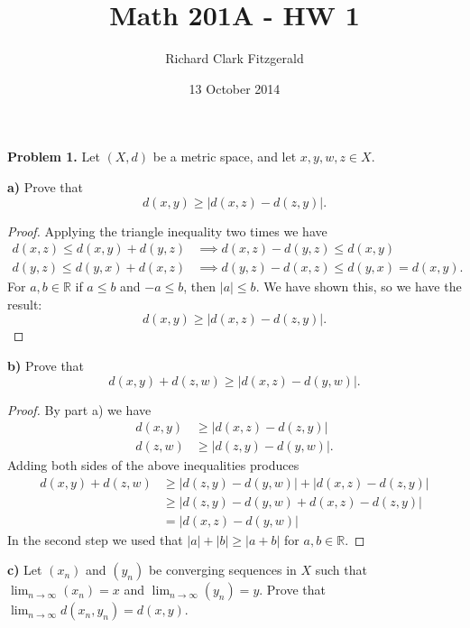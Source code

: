 \documentclass[12pt]{article}
\title{Math 201A - HW 1}
\date{13 October 2014}
\author{Richard Clark Fitzgerald}
\begin{document}
\maketitle

\textbf{Problem 1.}
Let $(X, d)$ be a metric space, and let $x, y, w, z \in X$.

\textbf{a)}
Prove that
\[
    d(x, y) \geq |d(x, z) - d(z, y)|.
\]

\begin{proof}

Applying the triangle inequality two times we have
\begin{align*}
    d(x, z) \leq d(x, y) + d(y, z) 
    &\implies 
    d(x, z) - d(y, z) \leq d(x, y) \\
    d(y, z) \leq d(y, x) + d(x, z)
    &\implies 
    d(y, z) - d(x, z) \leq d(y, x) = d(x, y).
\end{align*}
For $a, b \in \mathbb{R}$ if $a \leq b$ and $-a \leq b$, then
$|a| \leq b$. We have shown this, so we have the result:
\[
    d(x, y) \geq |d(x, z) - d(z, y)|.
\]

\end{proof}

\textbf{b)}
Prove that
\[
    d(x, y) + d(z, w) \geq |d(x, z) - d(y, w)|.
\]

\begin{proof}

By part a) we have
\begin{align*}
   d(x, y) &\geq |d(x, z) - d(z, y)| \\
   d(z, w) &\geq |d(z, y) - d(y, w)|.
\end{align*}
Adding both sides of the above inequalities produces
\begin{align*}
   d(x, y) + d(z, w) &\geq |d(z, y) - d(y, w)| + |d(x, z) - d(z, y)| \\
                     &\geq |d(z, y) - d(y, w) + d(x, z) - d(z, y)|  \\
                     &= |d(x, z) - d(y, w)|
\end{align*}
In the second step we used that $|a| + |b| \geq |a + b|$ for $a, b \in \mathbb{R}$.
\end{proof}

\newpage

\textbf{c)}
Let $(x_n)$ and $(y_n)$ be converging sequences in $X$ such that $\lim_{n
\rightarrow \infty} (x_n) = x$ and $\lim_{n \rightarrow \infty} (y_n) = y$.
Prove that $\lim_{n \rightarrow \infty} d(x_n, y_n) = d(x, y)$.

\newpage
\end{document}
